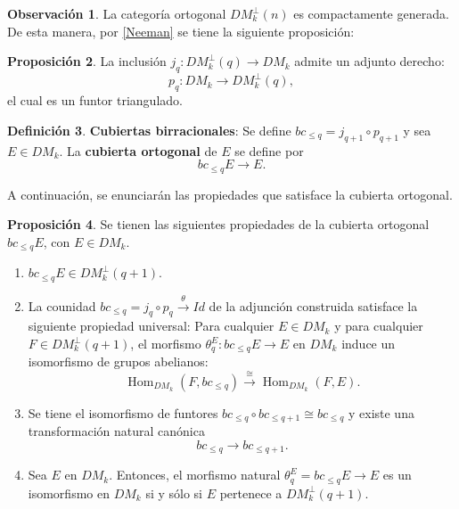 \documentclass[10pt]{amsart}
\theoremstyle{definition}
\newtheorem{definition}{Definici\'on}[section]
\newtheorem{obs}[definition]{Observaci\'on}
\newtheorem{proposition}[definition]{Proposici\'on}
\theoremstyle{remark}
\theoremstyle{definition}
\begin{document}
\begin{obs} La categoría ortogonal $DM^{\perp}_{k}(n)$ es compactamente generada. De esta manera, por \ref{Neeman} se tiene la siguiente proposición:
\end{obs}

\begin{proposition} La inclusi\'on $j_{q}:DM^{\perp}_{k}(q) \rightarrow DM_{k}$ admite un adjunto derecho:
\begin{equation*}
p_{q}:DM_{k} \rightarrow DM^{\perp}_{k}(q),
\end{equation*}
el cual es un funtor triangulado.
\end{proposition}
\begin{definition}
\textbf{Cubiertas birracionales}: Se define $bc_{\leq q} = j_{q+1} \circ p_{q+1}$ y sea $E \in DM_{k}$. La \textbf{cubierta ortogonal} de $E$ se define por 
\begin{equation*}
bc_{\leq q} E \rightarrow E.
\end{equation*}
\end{definition}

A continuación, se enunciarán las propiedades que satisface la cubierta ortogonal.

\begin{proposition} Se tienen las siguientes propiedades de la cubierta ortogonal $bc_{\leq q} E$, con $E \in DM_{k}$.
\begin{enumerate}
\item $bc_{\leq q} E \in DM^{\perp}_{k}(q+1)$.
\item La counidad $bc_{\leq q} = j_{q} \circ p_{q} \stackrel{\theta}{\rightarrow} Id$ de la adjunci\'on construida satisface la siguiente propiedad universal:
Para cualquier $E \in DM_{k}$ y para cualquier $F \in DM^{\perp}_{k}(q+1)$, el morfismo $\theta^{E}_{q}:bc_{\leq q} E \rightarrow E$ en $DM_{k}$ induce un isomorfismo de grupos abelianos:
\begin{equation*}
\operatorname{Hom}_{DM_{k}}(F,bc_{\leq q})  \stackrel{\cong}{\rightarrow}\operatorname{Hom}_{DM_{k}}(F,E).
\end{equation*}
\item Se tiene el isomorfismo de funtores $bc_{\leq q} \circ bc_{\leq q+1} \cong bc_{\leq q}$ y existe una transformación natural canónica 
\begin{equation*}
bc_{\leq q} \rightarrow bc_{\leq q+1}.
\end{equation*}
\item Sea $E$ en $DM_{k}$. Entonces, el morfismo natural $\theta^{E}_{q}=bc_{\leq q} E \rightarrow E$ es un isomorfismo en $DM_{k}$ si y s\'olo si $E$ pertenece a $DM^{\perp}_{k}(q+1)$.
\end{enumerate}
\end{proposition}
\end{document}
